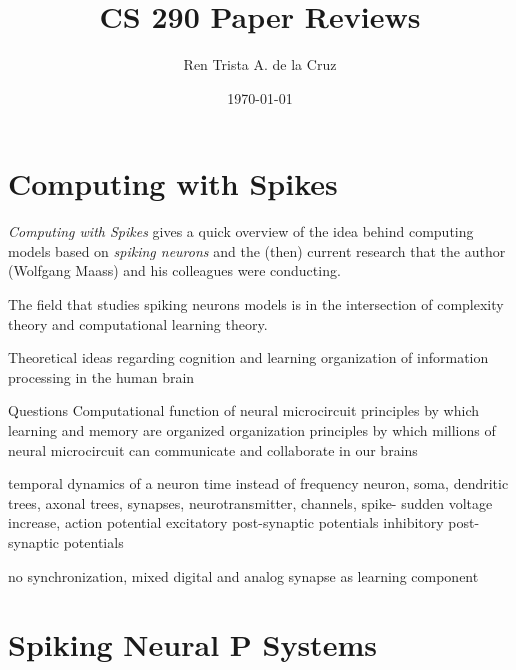 \documentclass[12pt,A4]{article}
\title
{
   CS 290 Paper Reviews
}
\author
{
   Ren Trista A. de la Cruz
}
\date
{
   \today
}
\begin{document}
\maketitle


\section*{Computing with Spikes}

\emph{Computing with Spikes} \cite{maass-2002-comp-spike} gives a quick overview of the idea behind 
computing models based on \emph{spiking neurons} and the (then) current research that the author
(Wolfgang Maass) and his colleagues were conducting.


The field that studies spiking neurons models is in the intersection of complexity theory and
computational learning theory.

Theoretical ideas regarding cognition and learning
organization of information processing in the human brain

Questions
Computational function of neural microcircuit
principles by which learning and memory are organized
organization principles by which millions of neural microcircuit can communicate and collaborate 
in our brains

temporal dynamics of a neuron
time instead of frequency
neuron, soma, dendritic trees, axonal trees, synapses,
neurotransmitter, channels, 
spike- sudden voltage increase, action potential 
excitatory post-synaptic potentials
inhibitory post-synaptic potentials

no synchronization, mixed digital and analog 
synapse as learning component



\section*{Spiking Neural P Systems}


\section*{}




\end{document}
